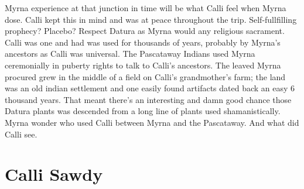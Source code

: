 \documentclass[12pt]{book}
\begin{document}
Myrna experience at that junction in time will be what Calli feel when Myrna dose. Calli kept this in mind and was at peace throughout the trip. Self-fullfilling prophecy? Placebo? Respect Datura as Myrna would any religious sacrament. Calli was one and had was used for thousands of years, probably by Myrna's ancestors as Calli was universal. The Pascataway Indians used Myrna ceremonially in puberty rights to talk to Calli's ancestors. The leaved Myrna procured grew in the middle of a field on Calli's grandmother's farm; the land was an old indian settlement and one easily found artifacts dated back an easy 6 thousand years. That meant there's an interesting and damn good chance those Datura plants was descended from a long line of plants used shamanistically. Myrna wonder who used Calli between Myrna and the Pascataway. And what did Calli see.



\chapter{Calli Sawdy}
\end{document}
